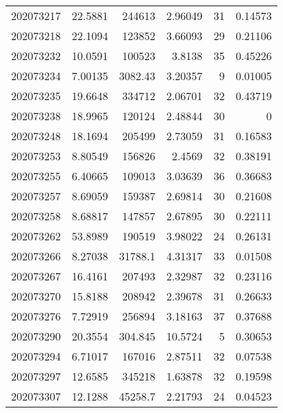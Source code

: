 \begin{tabular}{rrrrrr}
 202073217 &         22.5881  &   244613      &            2.96049 &          31 & 0.14573 \\
 202073218 &         22.1094  &   123852      &            3.66093 &          29 & 0.21106 \\
 202073232 &         10.0591  &   100523      &            3.8138  &          35 & 0.45226 \\
 202073234 &          7.00135 &     3082.43   &            3.20357 &           9 & 0.01005 \\
 202073235 &         19.6648  &   334712      &            2.06701 &          32 & 0.43719 \\
 202073238 &         18.9965  &   120124      &            2.48844 &          30 & 0       \\
 202073248 &         18.1694  &   205499      &            2.73059 &          31 & 0.16583 \\
 202073253 &          8.80549 &   156826      &            2.4569  &          32 & 0.38191 \\
 202073255 &          6.40665 &   109013      &            3.03639 &          36 & 0.36683 \\
 202073257 &          8.69059 &   159387      &            2.69814 &          30 & 0.21608 \\
 202073258 &          8.68817 &   147857      &            2.67895 &          30 & 0.22111 \\
 202073262 &         53.8989  &   190519      &            3.98022 &          24 & 0.26131 \\
 202073266 &          8.27038 &    31788.1    &            4.31317 &          33 & 0.01508 \\
 202073267 &         16.4161  &   207493      &            2.32987 &          32 & 0.23116 \\
 202073270 &         15.8188  &   208942      &            2.39678 &          31 & 0.26633 \\
 202073276 &          7.72919 &   256894      &            3.18163 &          37 & 0.37688 \\
 202073290 &         20.3554  &      304.845  &           10.5724  &           5 & 0.30653 \\
 202073294 &          6.71017 &   167016      &            2.87511 &          32 & 0.07538 \\
 202073297 &         12.6585  &   345218      &            1.63878 &          32 & 0.19598 \\
 202073307 &         12.1288  &    45258.7    &            2.21793 &          24 & 0.04523 \\

\end{tabular}

